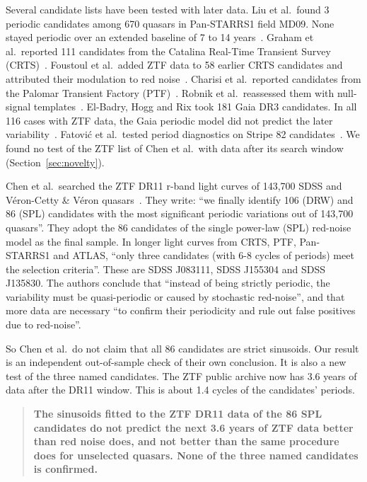 \documentclass[11pt]{article}
\begin{document}
Several candidate lists have been tested with later data. Liu et al.\ found 3 periodic candidates among 670 quasars in Pan-STARRS1 field MD09. None stayed periodic over an extended baseline of 7 to 14 years~\cite{liu2016}. Graham et al.\ reported 111 candidates from the Catalina Real-Time Transient Survey (CRTS)~\cite{graham2015}. Foustoul et al.\ added ZTF data to 58 earlier CRTS candidates and attributed their modulation to red noise~\cite{foustoul2025}. Charisi et al.\ reported candidates from the Palomar Transient Factory (PTF)~\cite{charisi2016}. Robnik et al.\ reassessed them with null-signal templates~\cite{robnik2024}. El-Badry, Hogg and Rix took 181 Gaia DR3 candidates. In all 116 cases with ZTF data, the Gaia periodic model did not predict the later variability~\cite{elbadry2025}. Fatovi\'c et al.\ tested period diagnostics on Stripe 82 candidates~\cite{fatovic2026}. We found no test of the ZTF list of Chen et al.\ with data after its search window (Section~\ref{sec:novelty}).

Chen et al.\ searched the ZTF DR11 r-band light curves of 143,700 SDSS and V\'eron-Cetty \& V\'eron quasars~\cite{chen2024}. They write: ``we finally identify 106 (DRW) and 86 (SPL) candidates with the most significant periodic variations out of 143,700 quasars''. They adopt the 86 candidates of the single power-law (SPL) red-noise model as the final sample. In longer light curves from CRTS, PTF, Pan-STARRS1 and ATLAS, ``only three candidates (with 6-8 cycles of periods) meet the selection criteria''. These are SDSS J083111, SDSS J155304 and SDSS J135830. The authors conclude that ``instead of being strictly periodic, the variability must be quasi-periodic or caused by stochastic red-noise'', and that more data are necessary ``to confirm their periodicity and rule out false positives due to red-noise''.

So Chen et al.\ do not claim that all 86 candidates are strict sinusoids. Our result is an independent out-of-sample check of their own conclusion. It is also a new test of the three named candidates. The ZTF public archive now has 3.6 years of data after the DR11 window. This is about 1.4 cycles of the candidates' periods.

\begin{quote}
\textbf{The sinusoids fitted to the ZTF DR11 data of the 86 SPL candidates do not predict the next 3.6 years of ZTF data better than red noise does, and not better than the same procedure does for unselected quasars. None of the three named candidates is confirmed.}
\end{quote}
\end{document}
